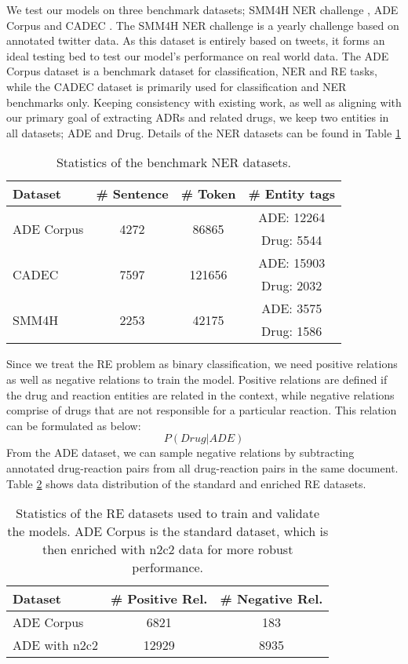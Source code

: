\documentclass[letterpaper]{article}
\begin{document}
We test our models on three benchmark datasets; SMM4H NER challenge \cite{ws-2019-social}, ADE Corpus \cite{GURULINGAPPA2012885} and CADEC \cite{article}. The SMM4H NER challenge is a yearly challenge based on annotated twitter data. As this dataset is entirely based on tweets, it forms an ideal testing bed to test our model's performance on real world data. The ADE Corpus dataset is a benchmark dataset for classification, NER and RE tasks, while the CADEC dataset is primarily used for classification and NER benchmarks only. Keeping consistency with existing work, as well as aligning with our primary goal of extracting ADRs and related drugs, we keep two entities in all datasets; ADE and Drug. Details of the NER datasets can be found in Table \ref{tab:ner_data_stats}

\begin{table}[ht]
\centering
\begin{tabular}{lccc}
\toprule
 \textbf{Dataset} & \textbf{\# Sentence} & \textbf{\# Token} & \textbf{\# Entity tags}\\
\midrule
 \multirow{2}{*}{ADE Corpus} & \multirow{2}{*}{4272} & \multirow{2}{*}{86865} & ADE: 12264\\
 &  &  & Drug: 5544\\ 
 \multirow{2}{*}{CADEC} & \multirow{2}{*}{7597} & \multirow{2}{*}{121656} & ADE: 15903\\
  &  &  & Drug: 2032\\
 \multirow{2}{*}{SMM4H} & \multirow{2}{*}{2253} & \multirow{2}{*}{42175} & ADE: 3575\\
  &  &  & Drug: 1586\\
\bottomrule
\end{tabular}
\caption{Statistics of the benchmark NER datasets.}
\label{tab:ner_data_stats}
\end{table}

Since we treat the RE problem as binary classification, we need positive relations as well as negative relations to train the model. Positive relations are defined if the drug and reaction entities are related in the context, while negative relations comprise of drugs that are not responsible for a particular reaction. This relation can be formulated as below: \[P(Drug|ADE)\] From the ADE dataset, we can sample negative relations by subtracting annotated drug-reaction pairs from all drug-reaction pairs in the same document. Table \ref{tab:re_data_stats} shows data distribution of the standard and enriched RE datasets. 

\begin{table}[ht]
\centering
\begin{tabular}{lcc}
\toprule
 \textbf{Dataset} & \textbf{\# Positive Rel.} & \textbf{\# Negative Rel.}\\
\midrule
 ADE Corpus & 6821 & 183 \\ 
 ADE with n2c2 & 12929 & 8935\\
\bottomrule
\end{tabular}
\caption{Statistics of the RE datasets used to train and validate the models. ADE Corpus is the standard dataset, which is then enriched with n2c2 data for more robust performance.}
\label{tab:re_data_stats}
\end{table}
\end{document}
